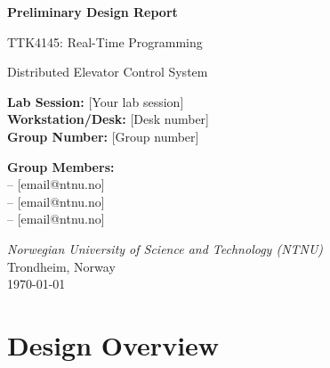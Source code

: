 \documentclass[12pt,a4paper]{article}
\begin{document}
\thispagestyle{empty}

\vspace*{2cm}

\begin{center}

{\LARGE \textbf{Preliminary Design Report}}

\vspace{0.5cm}

{\Large TTK4145: Real-Time Programming}

\vspace{0.5cm}

{\Large Distributed Elevator Control System}

\vspace{2cm}

\end{center}

\vspace{1cm}

\begin{flushleft}

\textbf{Lab Session:} [Your lab session] \\
\textbf{Workstation/Desk:} [Desk number] \\
\textbf{Group Number:} [Group number]

\vspace{2cm}

\textbf{Group Members:} \\
[Student Name 1] -- [email@ntnu.no] \\
[Student Name 2] -- [email@ntnu.no] \\
[Student Name 3] -- [email@ntnu.no]

\vspace{4cm}

{\small \textit{Norwegian University of Science and Technology (NTNU)} \\
Trondheim, Norway \\
\today}

\end{flushleft}

\newpage


\section*{Design Overview}
\end{document}
